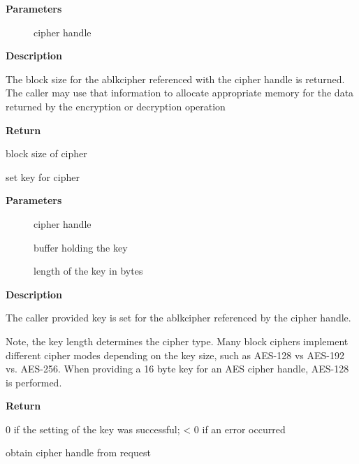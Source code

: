 \documentclass[a4paper,8pt,english]{sphinxmanual}
\begin{document}
\textbf{Parameters}
\begin{description}
\item[{}] \leavevmode
cipher handle

\end{description}

\textbf{Description}

The block size for the ablkcipher referenced with the cipher handle is
returned. The caller may use that information to allocate appropriate
memory for the data returned by the encryption or decryption operation

\textbf{Return}

block size of cipher

\begin{fulllineitems}
\label{crypto/api-skcipher:c.crypto_ablkcipher_setkey}
set key for cipher

\end{fulllineitems}


\textbf{Parameters}
\begin{description}
\item[{}] \leavevmode
cipher handle

\item[{}] \leavevmode
buffer holding the key

\item[{}] \leavevmode
length of the key in bytes

\end{description}

\textbf{Description}

The caller provided key is set for the ablkcipher referenced by the cipher
handle.

Note, the key length determines the cipher type. Many block ciphers implement
different cipher modes depending on the key size, such as AES-128 vs AES-192
vs. AES-256. When providing a 16 byte key for an AES cipher handle, AES-128
is performed.

\textbf{Return}

0 if the setting of the key was successful; \textless{} 0 if an error occurred

\begin{fulllineitems}
\label{crypto/api-skcipher:c.crypto_ablkcipher_reqtfm}
obtain cipher handle from request

\end{fulllineitems}
\end{document}
